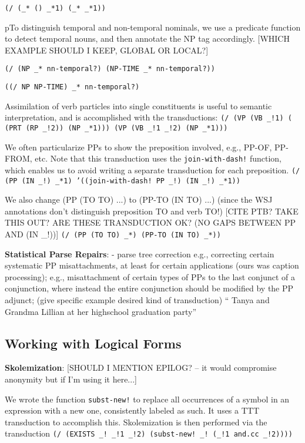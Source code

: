 \documentclass[11pt]{article}
\begin{document}
\texttt{(/ (\_* () \_*1) (\_* \_*1))}

pTo distinguish temporal and non-temporal nominals, we use a predicate function to detect temporal nouns, and then annotate the NP tag accordingly. [WHICH EXAMPLE SHOULD I KEEP, GLOBAL OR LOCAL?]

\texttt{(/ (NP \_* nn-temporal?) (NP-TIME \_* nn-temporal?))}

\texttt{((/ NP NP-TIME) \_* nn-temporal?)}


Assimilation of verb particles into single constituents is useful to semantic interpretation, and is accomplished with the transductions:
\texttt{(/ (VP (VB \_!1) ({} (PRT (RP \_!2)) (NP \_*1))) (VP (VB \_!1 \_!2)  (NP \_*1)))}


We often particularize PPs to show the preposition involved, e.g., PP-OF, PP-FROM,  etc.  Note that this transduction uses the \texttt{join-with-dash!} function, which enables us to avoid writing a separate transduction for each preposition.
\texttt{(/ (PP (IN \_!) \_*1) '((join-with-dash! PP \_!) (IN \_!) \_*1))}

We also change (PP (TO TO) ...) to (PP-TO (IN TO) ...) (since the WSJ annotations don't distinguish preposition TO and verb TO!) [CITE PTB? TAKE THIS OUT?  ARE THESE TRANSDUCTION OK? (NO GAPS BETWEEN PP AND (IN \_!))]
\texttt{(/ (PP (TO TO) \_*) (PP-TO (IN TO) \_*))}



{\bf Statistical Parse Repairs}:
 - parse tree correction
   e.g., correcting certain systematic PP misattachments, at least
         for certain applications (ours was caption processing);
         e.g., misattachment of certain types of PPs to the last
         conjunct of a conjunction, where instead the entire conjunction
         should be modified by the PP adjunct; (give specific example
         desired kind of transduction)
        `` Tanya and Grandma Lillian at her highschool graduation party''



\subsection*{Working with Logical Forms}
{\bf Skolemization}:
[SHOULD I MENTION EPILOG? -- it would compromise anonymity but if I'm using it here...] 

We wrote the function \texttt{subst-new!} to replace all occurrences of a symbol in an expression with a new one, consistently labeled as such.  It uses a TTT transduction to accomplish this. 
Skolemization is then performed via the transduction \texttt{(/ (EXISTS \_! \_!1 \_!2)  (subst-new! \_! (\_!1 and.cc \_!2))))}
\end{document}
